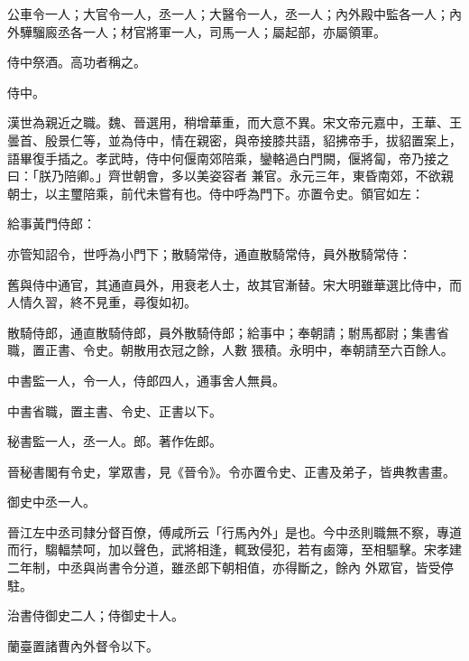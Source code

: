 \begin{pinyinscope}
 公車令一人；大官令一人，丞一人；大醫令一人，丞一人；內外殿中監各一人；內外驊騮廄丞各一人；材官將軍一人，司馬一人；屬起部，亦屬領軍。



 侍中祭酒。高功者稱之。



 侍中。



 漢世為親近之職。魏、晉選用，稍增華重，而大意不異。宋文帝元嘉中，王華、王曇首、殷景仁等，並為侍中，情在親密，與帝接膝共語，貂拂帝手，拔貂置案上，語畢復手插之。孝武時，侍中何偃南郊陪乘，鑾輅過白門闕，偃將匐，帝乃接之曰：「朕乃陪卿。」齊世朝會，多以美姿容者
 兼官。永元三年，東昏南郊，不欲親朝士，以主璽陪乘，前代未嘗有也。侍中呼為門下。亦置令史。領官如左：



 給事黃門侍郎：



 亦管知詔令，世呼為小門下；散騎常侍，通直散騎常侍，員外散騎常侍：



 舊與侍中通官，其通直員外，用衰老人士，故其官漸替。宋大明雖華選比侍中，而人情久習，終不見重，尋復如初。



 散騎侍郎，通直散騎侍郎，員外散騎侍郎；給事中；奉朝請；駙馬都尉；集書省職，置正書、令史。朝散用衣冠之餘，人數
 猥積。永明中，奉朝請至六百餘人。



 中書監一人，令一人，侍郎四人，通事舍人無員。



 中書省職，置主書、令史、正書以下。



 秘書監一人，丞一人。郎。著作佐郎。



 晉秘書閣有令史，掌眾書，見《晉令》。令亦置令史、正書及弟子，皆典教書畫。



 御史中丞一人。



 晉江左中丞司隸分督百僚，傅咸所云「行馬內外」是也。今中丞則職無不察，專道而行，騶輻禁呵，加以聲色，武將相逢，輒致侵犯，若有鹵簿，至相驅擊。宋孝建二年制，中丞與尚書令分道，雖丞郎下朝相值，亦得斷之，餘內
 外眾官，皆受停駐。



 治書侍御史二人；侍御史十人。



 蘭臺置諸曹內外督令以下。




\end{pinyinscope}
